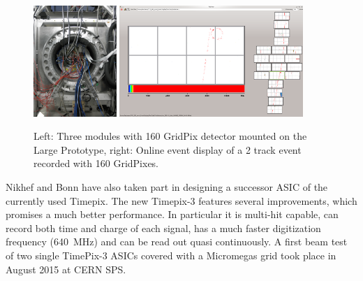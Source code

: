 \begin{figure}[!t]
  \centering
  \includegraphics[width=0.28\textwidth]{plots/TPC_pixels_LP_GridPixes.png}
  \includegraphics[width=0.62\textwidth]{plots/TPC_pixels_event.png}
  \caption{Left: Three modules with 160 GridPix detector mounted on the Large
    Prototype, right: Online event display of a 2 track event recorded with
    160 GridPixes.}
  \label{fig_TPC_pixels_2}
\end{figure}

Nikhef and Bonn have also taken part in designing a successor ASIC of
the currently used Timepix. The new Timepix-3 features several improvements,
which promises a much better performance. In particular it is multi-hit capable,
can record both time and charge of each signal, has a much faster
digitization frequency (\SI{640}{\mega\hertz}) and can be read out  quasi continuously.
A first beam test of two single TimePix-3 ASICs covered with a Micromegas
grid took place in August 2015 at CERN SPS.


